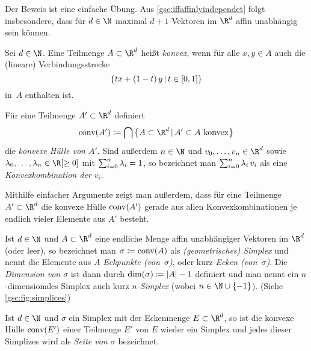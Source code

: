 Der Beweis ist eine einfache Übung.
Aus \cref{gsc:iffaffinlyindependet} folgt insbesondere, dass für $d\in\N$
maximal $d+1$ Vektoren im $\R^d$ affin unabhängig sein können.

\begin{thDef}
    Sei $d\in\N$. Eine Teilmenge $A\subset\R^d$ heißt \emph{konvex}, wenn
    für alle $x,y\in A$ auch die (lineare) Verbindungsstrecke
    \[ \{ tx + (1-t)\,y \Mid t\in[0,1] \} \]
    in~$A$ enthalten ist.

    \newpage
    \noindent
    Für eine Teilmenge $A'\subset\R^d$ definiert
    \[ \conv(A') \defeq 
        \bigcap \,\bigl\{ A\subset\R^d \Mid A'\subset A\text{ konvex} \bigr\}
    \]
    die \emph{konvexe Hülle von $A'$}.
    Sind außerdem $n\in\N$ und $v_0,\ldots,v_n\in\R^d$ sowie
    $\lambda_0,\ldots,\lambda_n\in\R[\geq0]$ mit $\sum_{i=0}^n\lambda_i = 1$, so
    bezeichnet man $\sum_{i=0}^n \lambda_i\,v_i$ als eine \emph{Konvexkombination der
    $v_i$}.
\end{thDef}

\begin{thBemerkung} \label{gsc:convexhullviaconvexcombinations}
    Mithilfe einfacher Argumente zeigt man außerdem, dass für eine Teilmenge
    $A'\subset\R^d$ die konvexe Hülle $\operatorname{conv}(A')$ gerade aus allen 
    Konvexkombinationen je endlich vieler Elemente aus $A'$ besteht.
\end{thBemerkung}


\begin{thDef}
    \label{gsc:def:simplex}
    Ist $d\in\N$ und $A\subset\R^d$ eine endliche Menge affin unabhängiger
    Vektoren im $\R^d$ (oder leer), so bezeichnet man $\sigma \coloneqq \operatorname{conv}(A)$ als
    \emph{(geometrisches) Simplex} und nennt die Elemente aus $A$
    \emph{Eckpunkte (von~$\sigma$)}, oder kurz \emph{Ecken (von~$\sigma$)}. Die
    \emph{Dimension von $\sigma$} ist dann durch $\dim(\sigma) \coloneqq \lvert A\rvert-1$
    definiert und man nennt ein $n$-dimensionales Simplex auch kurz
    \emph{$n$-Simplex} (wobei $n\in\N\cup\{-1\}$). 
    (Siehe \cref{gsc:fig:simplices})
\end{thDef}

\begin{thDef}
    Ist $d\in\N$ und $\sigma$ ein Simplex mit der Eckenmenge $E \subset\R^d$, so
    ist die konvexe Hülle $\operatorname{conv}(E')$ einer Teilmenge $E'$ von $E$ wieder ein
    Simplex und jedes dieser Simplizes wird als \emph{Seite von $\sigma$}
    bezeichnet.
\end{thDef}
\unskip  %

